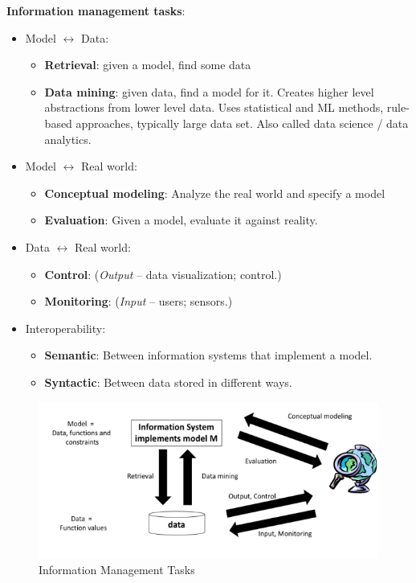 
\textbf{Information management tasks}:
\begin{itemize}
	\item Model $\leftrightarrow$ Data:
	\begin{itemize}
		\item \textbf{Retrieval}: given a model, find some data
		\item \textbf{Data mining}: given data, find a model for it. Creates higher level abstractions from lower level data. Uses statistical and ML methods, rule-based approaches, typically large data set. Also called data science / data analytics.
	\end{itemize}
	\item Model $\leftrightarrow$ Real world:
	\begin{itemize}
		\item \textbf{Conceptual modeling}: Analyze the real world and specify a model
		\item \textbf{Evaluation}: Given a model, evaluate it against reality.
	\end{itemize}
	\item Data $\leftrightarrow$ Real world:
	\begin{itemize}
		\item \textbf{Control}: (\emph{Output} -- data visualization; control.)
		\item \textbf{Monitoring}: (\emph{Input} -- users; sensors.)
	\end{itemize}
	\item Interoperability:
	\begin{itemize}
		\item \textbf{Semantic}: Between information systems that implement a model.
		\item \textbf{Syntactic}: Between data stored in different ways.
	\end{itemize}
\end{itemize}

    \begin{figure}[htp]
      \centering
        \includegraphics[width=\textwidth]{images/infotasks.png}
        \caption{Information Management Tasks}
        \label{fig:infotasks}
    \end{figure}

